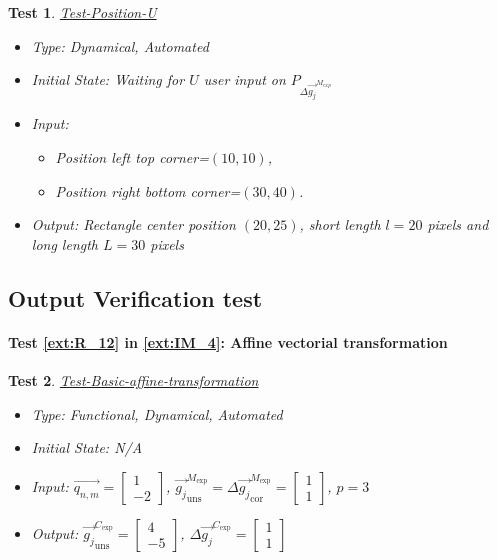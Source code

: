 \documentclass[12pt, titlepage]{article}
\newtheorem{Test}{Test}
\begin{document}
\begin{Test}\normalfont\underline{Test-Position-U}
\label{Test-Position-U}
\begin{itemize}
\item Type: Dynamical, Automated
\item Initial State: Waiting for $U$ user input on $P_{\Delta \overrightarrow{g_{j}}^{M_{exp}}}$
\item Input: 
	\begin{itemize}
	\item Position left top corner=$(10,10)$, 
	\item Position right bottom corner=$(30,40)$.
	\end{itemize}
\item Output: Rectangle center position $(20,25)$, short length $l=20$ pixels and long length $L=30$ pixels
\end{itemize}
\end{Test}


\subsection{Output Verification test}

\paragraph{Test \cref{ext:R_12} in \cref{ext:IM_4}: Affine vectorial transformation}

\begin{Test}\normalfont\underline{Test-Basic-affine-transformation}
\label{Test-Basic-affine-transformation}
\begin{itemize}
\item Type: Functional, Dynamical, Automated
\item Initial State: N/A
\item Input: $\overrightarrow{q_{n,m}}=\begin{bmatrix}
1 \\
-2
\end{bmatrix}$, $\overrightarrow{g_{j}}_{\text{uns}}^{M_{\text{exp}}}=\Delta\overrightarrow{g_{j}}_{\text{cor}}^{M_{\text{exp}}}=\begin{bmatrix}
1 \\
1
\end{bmatrix}$, $p=3$
\item Output:  $\overrightarrow{g_{j}}_{\text{uns}}^{C_{\text{exp}}}=\begin{bmatrix}
4\\
-5
\end{bmatrix}$, $\Delta\overrightarrow{g_{j}}^{C_{\text{exp}}}=\begin{bmatrix}
1\\
1
\end{bmatrix}$
\end{itemize}
\end{Test}
\end{document}
